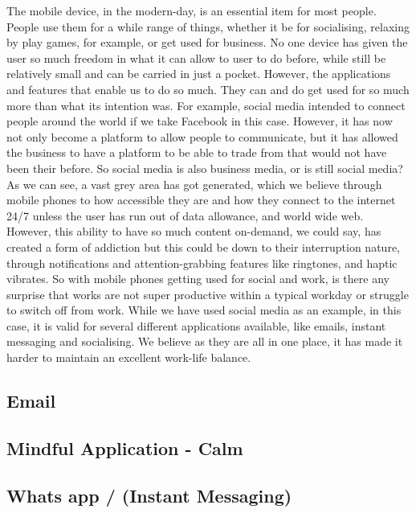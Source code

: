 \documentclass{sigchi}
\begin{document}
		The mobile device, in the modern-day, is an essential item for most people. People use them for a while range of things, whether it be for socialising, relaxing by play games, for example, or get used for business. No one device has given the user so much freedom in what it can allow to user to do before, while still be relatively small and can be carried in just a pocket. However, the applications and features that enable us to do so much. They can and do get used for so much more than what its intention was. For example, social media intended to connect people around the world if we take Facebook in this case. However, it has now not only become a platform to allow people to communicate, but it has allowed the business to have a platform to be able to trade from that would not have been their before. So social media is also business media, or is still social media? As we can see, a vast grey area has got generated, which we believe through mobile phones to how accessible they are and how they connect to the internet 24/7 unless the user has run out of data allowance, and world wide web. However, this ability to have so much content on-demand, we could say, has created a form of addiction but this could be down to their interruption nature, through notifications and attention-grabbing features like ringtones, and haptic vibrates. So with mobile phones getting used for social and work, is there any surprise that works are not super productive within a typical workday or struggle to switch off from work. While we have used social media as an example, in this case, it is valid for several different applications available, like emails, instant messaging and socialising. We believe as they are all in one place, it has made it harder to maintain an excellent work-life balance.
		
		\subsection{Email}
		
		
		\subsection{Mindful Application - Calm}
		
		\subsection{Whats app / (Instant Messaging)}
\end{document}
